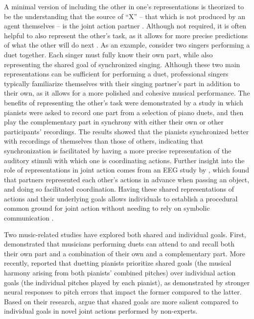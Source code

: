 \documentclass[10pt,a4paper,onecolumn]{article}
\begin{document}
A minimal version of including the other in one's representations is theorized to be the understanding that the source of ``X'' -- that which is not produced by an agent themselves -- is the joint action partner \autocite{loehrSoundYouMe2016,vesperMinimalArchitectureJoint2010} . Although not required, it is often helpful to also represent the other's task, as it allows for more precise predictions of what the other will do next \autocite{boltSensoryAttenuationAuditory2021,wenkeWhatSharedJoint2011}. As an example, consider two singers performing a duet together. Each singer must fully know their own part, while also representing the shared goal of synchronized singing. Although these two main representations can be sufficient for performing a duet, professional singers typically familiarize themselves with their singing partner's part in addition to their own, as it allows for a more polished and cohesive musical performance. The benefits of representing the other's task were demonstrated by a study \autocite{kellerPianistsDuetBetter2007} in which pianists were asked to record one part from a selection of piano duets, and then play the complementary part in synchrony with either their own or other participants' recordings. The results showed that the pianists synchronized better with recordings of themselves than those of others, indicating that synchronization is facilitated by having a more precise representation of the auditory stimuli with which one is coordinating actions. Further insight into the role of representations in joint action comes from an EEG study by \textcite{kourtisPredictiveRepresentationOther2012}, which found that partners represented each other's actions in advance when passing an object, and doing so facilitated coordination. Having these shared representations of actions and their underlying goals allows individuals to establish a procedural common ground for joint action without needing to rely on symbolic communication \autocite{sebanzJointActionBodies2006}.

Two music-related studies have explored both shared and individual goals. First, \textcite{kellerMusicalMeterAttention2005} demonstrated that musicians performing duets can attend to and recall both their own part and a combination of their own and a complementary part. More recently, \textcite{loehrMonitoringIndividualJoint2013} reported that duetting pianists prioritize shared goals (the musical harmony arising from both pianists' combined pitches) over individual action goals (the individual pitches played by each pianist), as demonstrated by stronger neural responses to pitch errors that impact the former compared to the latter. Based on their research, \textcite{loehrSoundYouMe2016} argue that shared goals are more salient compared to individual goals in novel joint actions performed by non-experts.
\end{document}
